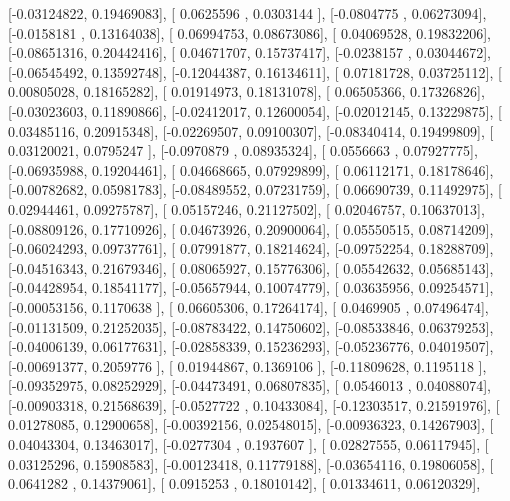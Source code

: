 \documentclass{article}
\begin{document}
       [-0.03124822,  0.19469083],
       [ 0.0625596 ,  0.0303144 ],
       [-0.0804775 ,  0.06273094],
       [-0.0158181 ,  0.13164038],
       [ 0.06994753,  0.08673086],
       [ 0.04069528,  0.19832206],
       [-0.08651316,  0.20442416],
       [ 0.04671707,  0.15737417],
       [-0.0238157 ,  0.03044672],
       [-0.06545492,  0.13592748],
       [-0.12044387,  0.16134611],
       [ 0.07181728,  0.03725112],
       [ 0.00805028,  0.18165282],
       [ 0.01914973,  0.18131078],
       [ 0.06505366,  0.17326826],
       [-0.03023603,  0.11890866],
       [-0.02412017,  0.12600054],
       [-0.02012145,  0.13229875],
       [ 0.03485116,  0.20915348],
       [-0.02269507,  0.09100307],
       [-0.08340414,  0.19499809],
       [ 0.03120021,  0.0795247 ],
       [-0.0970879 ,  0.08935324],
       [ 0.0556663 ,  0.07927775],
       [-0.06935988,  0.19204461],
       [ 0.04668665,  0.07929899],
       [ 0.06112171,  0.18178646],
       [-0.00782682,  0.05981783],
       [-0.08489552,  0.07231759],
       [ 0.06690739,  0.11492975],
       [ 0.02944461,  0.09275787],
       [ 0.05157246,  0.21127502],
       [ 0.02046757,  0.10637013],
       [-0.08809126,  0.17710926],
       [ 0.04673926,  0.20900064],
       [ 0.05550515,  0.08714209],
       [-0.06024293,  0.09737761],
       [ 0.07991877,  0.18214624],
       [-0.09752254,  0.18288709],
       [-0.04516343,  0.21679346],
       [ 0.08065927,  0.15776306],
       [ 0.05542632,  0.05685143],
       [-0.04428954,  0.18541177],
       [-0.05657944,  0.10074779],
       [ 0.03635956,  0.09254571],
       [-0.00053156,  0.1170638 ],
       [ 0.06605306,  0.17264174],
       [ 0.0469905 ,  0.07496474],
       [-0.01131509,  0.21252035],
       [-0.08783422,  0.14750602],
       [-0.08533846,  0.06379253],
       [-0.04006139,  0.06177631],
       [-0.02858339,  0.15236293],
       [-0.05236776,  0.04019507],
       [-0.00691377,  0.2059776 ],
       [ 0.01944867,  0.1369106 ],
       [-0.11809628,  0.1195118 ],
       [-0.09352975,  0.08252929],
       [-0.04473491,  0.06807835],
       [ 0.0546013 ,  0.04088074],
       [-0.00903318,  0.21568639],
       [-0.0527722 ,  0.10433084],
       [-0.12303517,  0.21591976],
       [ 0.01278085,  0.12900658],
       [-0.00392156,  0.02548015],
       [-0.00936323,  0.14267903],
       [ 0.04043304,  0.13463017],
       [-0.0277304 ,  0.1937607 ],
       [ 0.02827555,  0.06117945],
       [ 0.03125296,  0.15908583],
       [-0.00123418,  0.11779188],
       [-0.03654116,  0.19806058],
       [ 0.0641282 ,  0.14379061],
       [ 0.0915253 ,  0.18010142],
       [ 0.01334611,  0.06120329],
\end{document}
